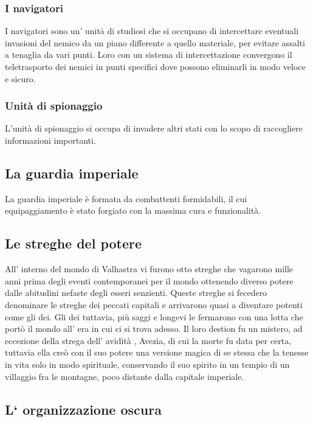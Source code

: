 \documentclass[a4paper,12pt]{book}
\begin{document}
\subsubsection{I navigatori}

I navigatori sono un' unità di studiosi che si occupano di intercettare eventuali invasioni del nemico da un piano differente a quello materiale, per evitare assalti a tenaglia da vari punti.
Loro con un sistema di intercettazione convergono il teletrasporto dei nemici in punti specifici dove possono eliminarli in modo veloce e sicuro.

\subsubsection{Unità di spionaggio}

L'unità di spionaggio si occupa di invadere altri stati con lo scopo di raccogliere informazioni importanti.

\subsection{La guardia imperiale}

La guardia imperiale è formata da combattenti formidabili, il cui equipaggiamento è stato forgiato con la massima cura e funzionalità.

\subsection{Le streghe del potere}

All' interno del mondo di Valhastra vi furono otto streghe che vagarono mille anni prima degli eventi contemporanei per il mondo ottenendo diverso potere dalle abitudini nefaste degli esseri senzienti.
Queste streghe si fecedero denominare le streghe dei peccati capitali e arrivarono quasi a diventare potenti come gli dei.
Gli dei tuttavia, più saggi e longevi le fermarono con una lotta che portò il mondo all' era in cui ci si trova adesso.
Il loro destion fu un mistero, ad eccezione della strega dell' avidità , Avezia, di cui la morte fu data per certa, tuttavia ella creò con il suo potere una versione magica di se stessa che la tenesse in vita solo in modo spirituale, conservando il suo spirito in un tempio di un villaggio fra le montagne, poco distante dalla capitale imperiale. 

\subsection{L` organizzazione oscura}
\end{document}
